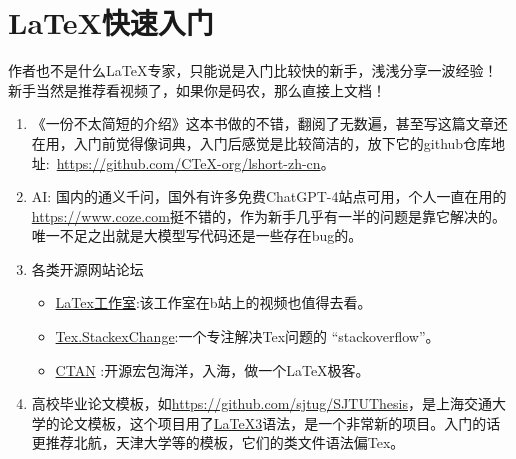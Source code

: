 \section{\LaTeX 快速入门}
作者也不是什么LaTeX专家，只能说是入门比较快的新手，浅浅分享一波经验！
新手当然是推荐看视频了，如果你是码农，那么直接上文档！
\begin{enumerate}
    \item 《一份不太简短的\LaTeXe 介绍》这本书做的不错，翻阅了无数遍，甚至写这篇文章还在用，入门前觉得像词典，入门后感觉是比较简洁的，放下它的github仓库地址:~\url{https://github.com/CTeX-org/lshort-zh-cn}。
    \item AI: 国内的通义千问，国外有许多免费ChatGPT-4站点可用，个人一直在用的\url{https://www.coze.com}挺不错的，作为新手几乎有一半的问题是靠它解决的。唯一不足之出就是大模型写代码还是一些存在bug的。
    \item 各类开源网站论坛
    \begin{itemize}
        \item \href{https://www.latexstudio.net/}{LaTex工作室}:该工作室在b站上的视频也值得去看。
        \item  \href{https://tex.stackexchange.com}{Tex.StackexChange}:一个专注解决Tex问题的 ``stackoverflow''。
        \item \href{https://ctan.org/}{CTAN} :开源宏包海洋，入海，做一个\LaTeX 极客。
    \end{itemize}
    \item  高校毕业论文模板，如\url{https://github.com/sjtug/SJTUThesis}，是上海交通大学的论文模板，这个项目用了\href{https://www.latex-project.org/latex3/}{\LaTeX3}语法，是一个非常新的项目。入门的话更推荐北航，天津大学等的模板，它们的类文件语法偏Tex。
\end{enumerate}


